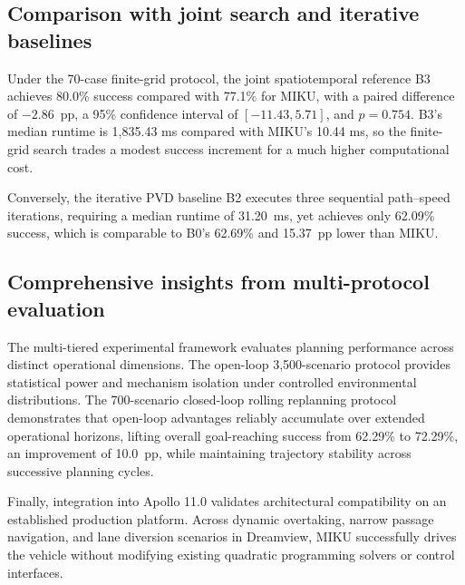 \subsection{Comparison with joint search and iterative baselines}

Under the 70-case finite-grid protocol, the joint spatiotemporal reference B3 achieves 80.0\% success compared with 77.1\% for MIKU, with a paired difference of $-2.86$~pp, a 95\% confidence interval of $[-11.43,5.71]$, and $p=0.754$. B3's median runtime is 1,835.43 ms compared with MIKU's 10.44 ms, so the finite-grid search trades a modest success increment for a much higher computational cost.

Conversely, the iterative PVD baseline B2 executes three sequential path--speed iterations, requiring a median runtime of 31.20~ms, yet achieves only 62.09\% success, which is comparable to B0's 62.69\% and 15.37~pp lower than MIKU.

\subsection{Comprehensive insights from multi-protocol evaluation}

The multi-tiered experimental framework evaluates planning performance across distinct operational dimensions. The open-loop 3,500-scenario protocol provides statistical power and mechanism isolation under controlled environmental distributions. The 700-scenario closed-loop rolling replanning protocol demonstrates that open-loop advantages reliably accumulate over extended operational horizons, lifting overall goal-reaching success from 62.29\% to 72.29\%, an improvement of 10.0~pp, while maintaining trajectory stability across successive planning cycles.

Finally, integration into Apollo 11.0 validates architectural compatibility on an established production platform. Across dynamic overtaking, narrow passage navigation, and lane diversion scenarios in Dreamview, MIKU successfully drives the vehicle without modifying existing quadratic programming solvers or control interfaces.
